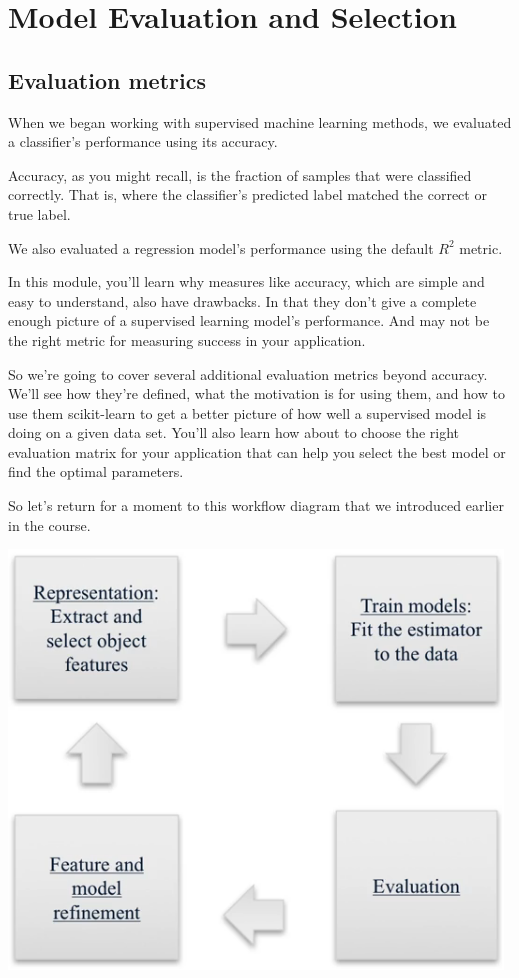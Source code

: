 \section{Model Evaluation and Selection}
\begin{multicols}{2}

\subsection{Evaluation metrics}
When we began working with supervised machine learning methods, we evaluated a classifier's performance using its accuracy. 

Accuracy, as you might recall, is the fraction of samples that were classified correctly. That is, where the classifier's predicted label matched the correct or true label. 

We also evaluated a regression model's performance using the default $R^2$ metric. 

In this module, you'll learn why measures like accuracy, which are simple and easy to understand, also have drawbacks. In that they don't give a complete enough picture of a supervised learning model's performance. And may not be the right metric for measuring success in your application. 

So we're going to cover several additional evaluation metrics beyond accuracy. We'll see how they're defined, what the motivation is for using them, and how to use them scikit-learn to get a better picture of how well a supervised model is doing on a given data set. You'll also learn how about to choose the right evaluation matrix for your application that can help you select the best model or find the optimal parameters. 

So let's return for a moment to this workflow diagram that we introduced earlier in the course. 

\begin{center}
    \includegraphics[width=\linewidth]{img/ML-cycle.png} 
\end{center}


\end{multicols}
